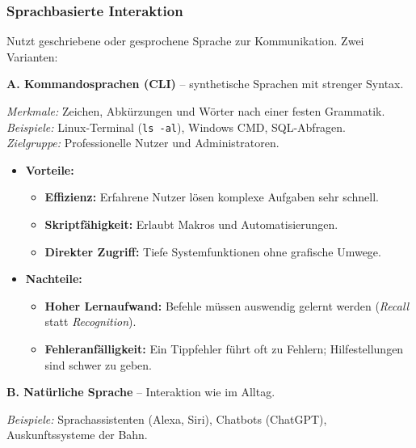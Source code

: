 \documentclass[12pt, a4paper]{article}
\begin{document}
\subsubsection{Sprachbasierte Interaktion}

Nutzt geschriebene oder gesprochene Sprache zur Kommunikation. Zwei Varianten:

\textbf{A. Kommandosprachen (CLI)} -- synthetische Sprachen mit strenger Syntax.

\textit{Merkmale:} Zeichen, Abkürzungen und Wörter nach einer festen Grammatik.\\
\textit{Beispiele:} Linux-Terminal (\texttt{ls -al}), Windows CMD, SQL-Abfragen.\\
\textit{Zielgruppe:} Professionelle Nutzer und Administratoren.

\begin{itemize}
  \item \textbf{Vorteile:}
    \begin{itemize}
      \item \textbf{Effizienz:} Erfahrene Nutzer lösen komplexe Aufgaben sehr schnell.
      \item \textbf{Skriptfähigkeit:} Erlaubt Makros und Automatisierungen.
      \item \textbf{Direkter Zugriff:} Tiefe Systemfunktionen ohne grafische Umwege.
    \end{itemize}
  \item \textbf{Nachteile:}
    \begin{itemize}
      \item \textbf{Hoher Lernaufwand:} Befehle müssen auswendig gelernt werden
            (\textit{Recall} statt \textit{Recognition}).
      \item \textbf{Fehleranfälligkeit:} Ein Tippfehler führt oft zu Fehlern;
            Hilfestellungen sind schwer zu geben.
    \end{itemize}
\end{itemize}

\textbf{B. Natürliche Sprache} -- Interaktion wie im Alltag.

\textit{Beispiele:} Sprachassistenten (Alexa, Siri), Chatbots (ChatGPT),
Auskunftssysteme der Bahn.
\end{document}
